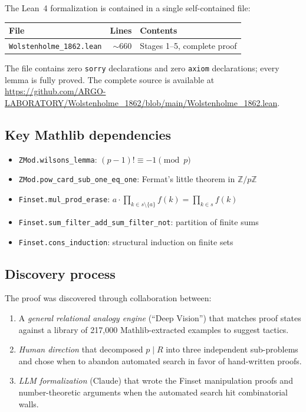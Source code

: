 \documentclass[11pt]{article}
\theoremstyle{definition}
\theoremstyle{remark}
\begin{document}
The Lean~4 formalization is contained in a single self-contained file:

\begin{center}
\begin{tabular}{lrl}
\textbf{File} & \textbf{Lines} & \textbf{Contents} \\
\hline
\texttt{Wolstenholme\_1862.lean} & $\sim$660 & Stages 1--5, complete proof \\
\end{tabular}
\end{center}

The file contains zero \texttt{sorry} declarations and zero \texttt{axiom} declarations; every lemma is fully proved. The complete source is available at \url{https://github.com/ARGO-LABORATORY/Wolstenholme_1862/blob/main/Wolstenholme_1862.lean}.

\subsection{Key Mathlib dependencies}

\begin{itemize}
\item \texttt{ZMod.wilsons\_lemma}: $(p-1)! \equiv -1 \pmod{p}$
\item \texttt{ZMod.pow\_card\_sub\_one\_eq\_one}: Fermat's little theorem in $\mathbb{Z}/p\mathbb{Z}$
\item \texttt{Finset.mul\_prod\_erase}: $a \cdot \prod_{k \in s \setminus \{a\}} f(k) = \prod_{k \in s} f(k)$
\item \texttt{Finset.sum\_filter\_add\_sum\_filter\_not}: partition of finite sums
\item \texttt{Finset.cons\_induction}: structural induction on finite sets
\end{itemize}

\subsection{Discovery process}

The proof was discovered through collaboration between:
\begin{enumerate}
\item A \emph{general relational analogy engine} (``Deep Vision'') that matches proof states against a library of 217{,}000 Mathlib-extracted examples to suggest tactics.
\item \emph{Human direction} that decomposed $p \mid R$ into three independent sub-problems and chose when to abandon automated search in favor of hand-written proofs.
\item \emph{LLM formalization} (Claude) that wrote the Finset manipulation proofs and number-theoretic arguments when the automated search hit combinatorial walls.
\end{enumerate}
\end{document}
